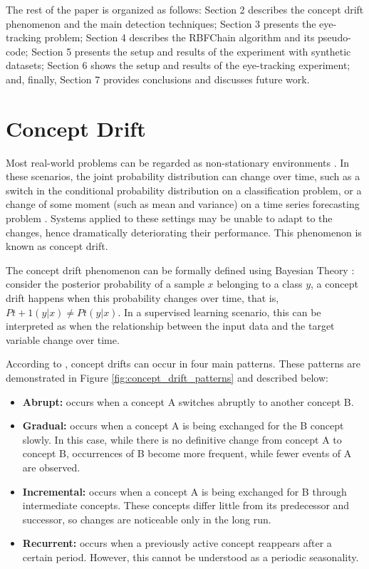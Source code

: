 \documentclass[preprint,12pt]{elsarticle}
\begin{document}
The rest of the paper is organized as follows:
Section 2 describes the concept drift phenomenon and the main detection techniques;
Section 3 presents the eye-tracking problem;
Section 4 describes the RBFChain algorithm and its pseudo-code;
Section 5 presents the setup and results of the experiment with synthetic datasets;
Section 6 shows the setup and results of the eye-tracking experiment;
and, finally, Section 7 provides conclusions and discusses future work.

\section{Concept Drift}
\label{sec:concept_drift}

Most real-world problems can be regarded as non-stationary environments \cite{Gama:2014:DAF:2670967.2670971}.
In these scenarios, the joint probability distribution can change over time,
such as a switch in the conditional probability distribution on a classification problem,
or a change of some moment (such as mean and variance) on a time series forecasting problem \cite{tsymbal2004problem}.
%
Systems applied to these settings may be unable to adapt to the changes, hence dramatically deteriorating their performance.
This phenomenon is known as concept drift.

The concept drift phenomenon can be formally defined using Bayesian Theory \cite{Elwell:2011}:
consider the posterior probability of a sample $x$ belonging to a class $y$, a concept drift happens when this probability changes over time, that is, $Pt + 1 (y | x) \neq Pt (y | x)$. In a supervised learning scenario, this can be interpreted as when the relationship between the input data and the target variable change over time.

According to \cite{tsymbal2004problem, Gama:2014:DAF:2670967.2670971}, concept drifts can occur in four main patterns.
These patterns are demonstrated in Figure \ref{fig:concept_drift_patterns} and described below:

\begin{itemize}
    \item \textbf{Abrupt:} occurs when a concept A switches abruptly to another concept B.
    \item \textbf{Gradual:} occurs when a concept A is being exchanged for the B concept slowly. In this case, while there is no definitive change from concept A to concept B, occurrences of B become more frequent, while fewer events of A are observed.
    \item \textbf{Incremental:} occurs when a concept A is being exchanged for B through intermediate concepts.  These concepts differ little from its predecessor and successor, so changes are noticeable only in the long run.
    \item \textbf{Recurrent:} occurs when a previously active concept reappears after a certain period. However, this cannot be understood as a periodic seasonality.
\end{itemize}
\end{document}
